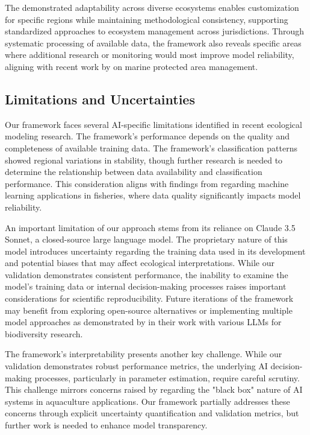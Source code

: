 The demonstrated adaptability across diverse ecosystems enables customization for specific regions while maintaining methodological consistency, supporting standardized approaches to ecosystem management across jurisdictions. Through systematic processing of available data, the framework also reveals specific areas where additional research or monitoring would most improve model reliability, aligning with recent work by \cite{Chen2024} on marine protected area management.


\subsection{Limitations and Uncertainties}

Our framework faces several AI-specific limitations identified in recent ecological modeling research. The framework's performance depends on the quality and completeness of available training data. The framework's classification patterns showed regional variations in stability, though further research is needed to determine the relationship between data availability and classification performance. This consideration aligns with findings from \cite{Kuhn2024} regarding machine learning applications in fisheries, where data quality significantly impacts model reliability.

An important limitation of our approach stems from its reliance on Claude 3.5 Sonnet, a closed-source large language model. The proprietary nature of this model introduces uncertainty regarding the training data used in its development and potential biases that may affect ecological interpretations. While our validation demonstrates consistent performance, the inability to examine the model's training data or internal decision-making processes raises important considerations for scientific reproducibility. Future iterations of the framework may benefit from exploring open-source alternatives or implementing multiple model approaches as demonstrated by \cite{Kommineni2024} in their work with various LLMs for biodiversity research.

The framework's interpretability presents another key challenge. While our validation demonstrates robust performance metrics, the underlying AI decision-making processes, particularly in parameter estimation, require careful scrutiny. This challenge mirrors concerns raised by \cite{Fernandes2024} regarding the "black box" nature of AI systems in aquaculture applications. Our framework partially addresses these concerns through explicit uncertainty quantification and validation metrics, but further work is needed to enhance model transparency.


